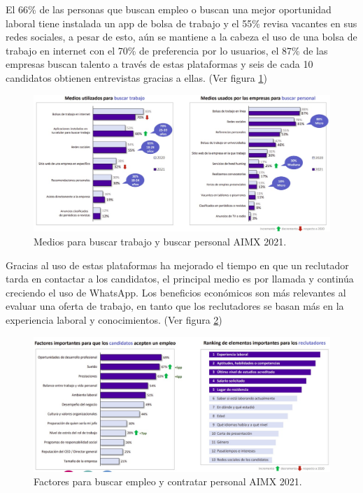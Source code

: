 El 66\% de las personas que buscan empleo o buscan una mejor oportunidad laboral tiene instalada un app de bolsa de trabajo y el 55\%  revisa vacantes en sus redes sociales, a pesar de esto, aún se mantiene a la cabeza el uso de una bolsa de trabajo en internet con el 70\% de preferencia por lo usuarios, el 87\% de las empresas buscan talento a través de estas plataformas y seis de cada 10 candidatos obtienen entrevistas gracias a ellas. \cite{AIMX}(Ver figura \ref{mark:med})

    \begin{figure}[H]
        \begin{center}
            \includegraphics[width=.8\textwidth]{antecedentes/imagenes/medios.jpeg}
        \end{center}
        \caption{Medios para buscar trabajo y buscar personal AIMX 2021.}
        \label{mark:med}
    \end{figure}

 Gracias al uso de estas plataformas ha mejorado el tiempo en que un reclutador tarda en contactar a los candidatos, el principal medio es por llamada y continúa creciendo el uso de WhatsApp. Los beneficios económicos son más relevantes al evaluar una oferta de trabajo, en tanto que los reclutadores se basan más en la experiencia laboral y conocimientos. (Ver figura \ref{mark:fac})

    \begin{figure}[H]
        \begin{center}
            \includegraphics[width=.8\textwidth]{antecedentes/imagenes/consideraciones.jpeg}
        \end{center}
        \caption{Factores para buscar empleo y contratar personal AIMX 2021.}
        \label{mark:fac}
    \end{figure}


